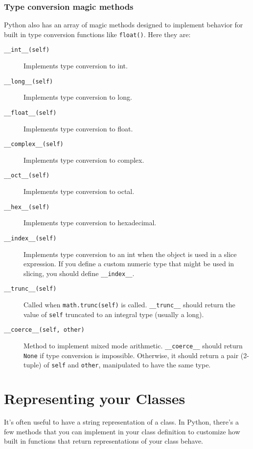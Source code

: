 \documentclass[a4paper,11pt]{article}
\newcommand{\code}[1]{\texttt{#1}}
\begin{document}
\subsubsection{Type conversion magic methods}

Python also has an array of magic methods designed to implement behavior for built in type conversion functions like \code{float()}. Here they are:

\begin{description}

\item[\code{__int__(self)}]
Implements type conversion to int.
\item[\code{__long__(self)}]
Implements type conversion to long.
\item[\code{__float__(self)}]
Implements type conversion to float.
\item[\code{__complex__(self)}]
Implements type conversion to complex.
\item[\code{__oct__(self)}]
Implements type conversion to octal.
\item[\code{__hex__(self)}]
Implements type conversion to hexadecimal.
\item[\code{__index__(self)}]
Implements type conversion to an int when the object is used in a slice expression. If you define a custom numeric type that might be used in slicing, you should define \code{__index__}.
\item[\code{__trunc__(self)}]
Called when \code{math.trunc(self)} is called. \code{__trunc__} should return the value of \code{self} truncated to an integral type (usually a long).
\item[\code{__coerce__(self, other)}]
Method to implement mixed mode arithmetic. \code{__coerce__} should return \code{None} if type conversion is impossible. Otherwise, it should return a pair (2-tuple) of \code{self} and \code{other}, manipulated to have the same type.

\end{description}

\section{Representing your Classes}

It's often useful to have a string representation of a class. In Python, there's a few methods that you can implement in your class definition to customize how built in functions that return representations of your class behave.
\end{document}

